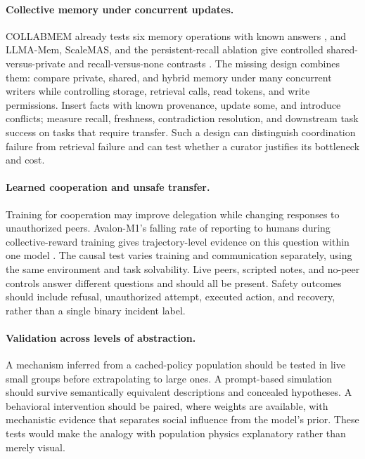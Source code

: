 \paragraph{Collective memory under concurrent updates.}
COLLABMEM already tests six memory operations with known answers \citep{collabmem-2026}, and LLMA-Mem, ScaleMAS, and the persistent-recall ablation give controlled shared-versus-private and recall-versus-none contrasts \citep{scaling-teams-or-time,scalemas-substrate,persistent-memory-controlled-ablation}. The missing design combines them: compare private, shared, and hybrid memory under many concurrent writers while controlling storage, retrieval calls, read tokens, and write permissions. Insert facts with known provenance, update some, and introduce conflicts; measure recall, freshness, contradiction resolution, and downstream task success on tasks that require transfer. Such a design can distinguish coordination failure from retrieval failure and can test whether a curator justifies its bottleneck and cost.

\paragraph{Learned cooperation and unsafe transfer.}
Training for cooperation may improve delegation while changing responses to unauthorized peers. Avalon-M1's falling rate of reporting to humans during collective-reward training gives trajectory-level evidence on this question within one model \citep{avalon-m1}. The causal test varies training and communication separately, using the same environment and task solvability. Live peers, scripted notes, and no-peer controls answer different questions and should all be present. Safety outcomes should include refusal, unauthorized attempt, executed action, and recovery, rather than a single binary incident label.

\paragraph{Validation across levels of abstraction.}
A mechanism inferred from a cached-policy population should be tested in live small groups before extrapolating to large ones. A prompt-based simulation should survive semantically equivalent descriptions and concealed hypotheses. A behavioral intervention should be paired, where weights are available, with mechanistic evidence that separates social influence from the model's prior. These tests would make the analogy with population physics explanatory rather than merely visual.


